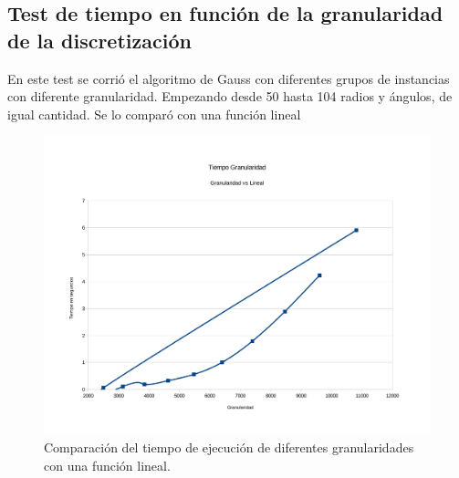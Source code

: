 \subsection{Test de tiempo en función de la granularidad de la discretización}
En este test se corrió el algoritmo de Gauss con diferentes grupos de instancias con diferente
granularidad. Empezando desde 50 hasta 104 radios y ángulos, de igual cantidad. Se lo comparó con
una función lineal

\begin{figure}[H]{}
\centering
\includegraphics[scale=0.5]{graphs/granuVstiempo.pdf}
\caption{Comparación del tiempo de ejecución de diferentes granularidades con una función lineal.}
\label{gaussVsLU1}
\end{figure}


